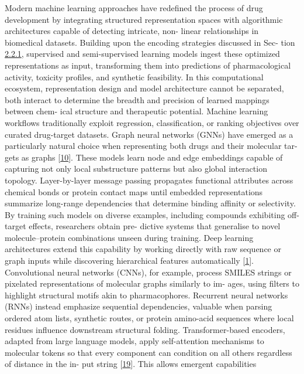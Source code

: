 \documentclass[
]{article}
\begin{document}
Modern machine learning approaches have redefined the process of drug
development by integrating structured representation spaces with
algorithmic architectures capable of detecting intricate, non- linear
relationships in biomedical datasets. Building upon the encoding
strategies discussed in Sec- tion
\hyperref[feature-encoding-and-transformation]{2.2.1}, supervised and
semi-supervised learning models ingest these optimized representations
as input, transforming them into predictions of pharmacological
activity, toxicity profiles, and synthetic feasibility. In this
computational ecosystem, representation design and model architecture
cannot be separated, both interact to determine the breadth and
precision of learned mappings between chem- ical structure and
therapeutic potential. Machine learning workflows traditionally exploit
regression, classification, or ranking objectives over curated
drug-target datasets. Graph neural networks (GNNs) have emerged as a
particularly natural choice when representing both drugs and their
molecular tar- gets as graphs {[}\hyperref[_bookmark50]{10}{]}. These
models learn node and edge embeddings capable of capturing not only
local substructure patterns but also global interaction topology.
Layer-by-layer message passing propagates functional attributes across
chemical bonds or protein contact maps until embedded representations
summarize long-range dependencies that determine binding affinity or
selectivity. By training such models on diverse examples, including
compounds exhibiting off-target effects, researchers obtain pre- dictive
systems that generalise to novel molecule--protein combinations unseen
during training. Deep learning architectures extend this capability by
working directly with raw sequence or graph inputs while discovering
hierarchical features automatically {[}\hyperref[_bookmark41]{1}{]}.
Convolutional neural networks (CNNs), for example, process SMILES
strings or pixelated representations of molecular graphs similarly to
im- ages, using filters to highlight structural motifs akin to
pharmacophores. Recurrent neural networks (RNNs) instead emphasize
sequential dependencies, valuable when parsing ordered atom lists,
synthetic routes, or protein amino-acid sequences where local residues
influence downstream structural folding. Transformer-based encoders,
adapted from large language models, apply self-attention mechanisms to
molecular tokens so that every component can condition on all others
regardless of distance in the in- put string
{[}\hyperref[_bookmark59]{19}{]}. This allows emergent capabilities
\end{document}
